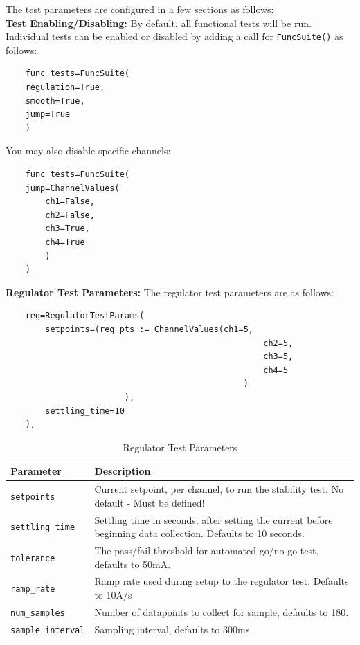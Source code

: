 
\newpage
{}
\label{sec:Functional-Test-Params}
\par\medskip
The test parameters are configured in a few sections as follows:\\
\noindent\normalsize\textbf{Test Enabling/Disabling:} By default, all functional tests will be run. Individual tests can be enabled or disabled by adding a call for \texttt{FuncSuite()} as follows:
\begin{verbatim}
	func_tests=FuncSuite(
	regulation=True,
	smooth=True,
	jump=True
	)
\end{verbatim}
\medskip
You may also disable specific channels: 
\begin{verbatim}
	func_tests=FuncSuite(
	jump=ChannelValues(
		ch1=False,
		ch2=False,
		ch3=True,
		ch4=True
		)
	)
\end{verbatim}

\newpage
{}
\label{sec:regulator-test-parameters}
\noindent\normalsize\textbf{Regulator Test Parameters:} The regulator test parameters are as follows:
\begin{verbatim}
	reg=RegulatorTestParams(
		setpoints=(reg_pts := ChannelValues(ch1=5,
                                                    ch2=5,
                                                    ch3=5,
                                                    ch4=5
	                                            )
	                    ),
		settling_time=10
	),
\end{verbatim}
\begin{table}[H]
	\centering
	\begin{tabular}{p{4cm}p{10cm}}
		\toprule
		\textbf{Parameter} & \textbf{Description} \\
		\midrule
		
		\texttt{setpoints} &
		Current setpoint, per channel, to run the stability test. No default - Must be defined!\\
		
		\texttt{settling\_time} &
		Settling time in seconds, after setting the current before beginning data collection. Defaults to 10 seconds.\\

		\texttt{tolerance} &
		The pass/fail threshold for automated go/no-go test, defaults to 50mA.\\
		
		\texttt{ramp\_rate} &
		Ramp rate used during setup to the regulator test. Defaults to 10A/s\\
		
		\texttt{num\_samples} &
		Number of datapoints to collect for sample, defaults to 180.\\
		
		\texttt{sample\_interval} &
		Sampling interval, defaults to 300ms\\

		\bottomrule
	\end{tabular}
	\caption{Regulator Test Parameters}
	\label{tab:regulator-test-parameters}
\end{table}

